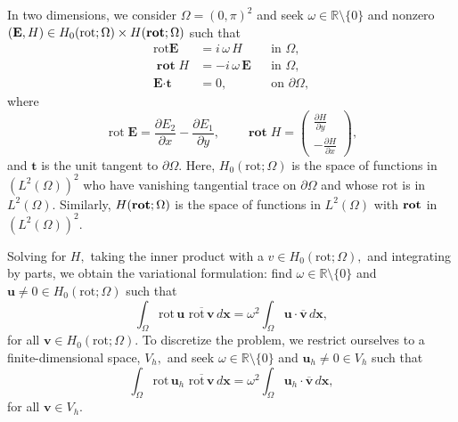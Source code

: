 \documentclass[12pt,a4paper]{article}
\theoremstyle{boldthm}
\theoremstyle{bolddefn}
\begin{document}
In two dimensions, we consider $\Omega = (0, \pi)^2$ and seek $\omega \in \mathbb{R} \setminus \{0\}$ and nonzero $(\mathbf{E}, H) \in H_0(\text{rot}; \Omega) \times H(\text{\textbf{rot}}; \Omega)$ such that 
\begin{equation}
    \begin{aligned}
\operatorname{rot} \textbf{E} &= i \, \omega \, H
&& \text{in } \Omega,\\
\operatorname{\textbf{rot}} H &= -i\, \omega \,  \textbf{E}
&& \text{in } \Omega,\\
\textbf{E}\cdot \textbf{t} &= 0,
&& \text{on } \partial\Omega,
\end{aligned}
\end{equation}
where 
\begin{equation}
    \operatorname{rot} \mathbf{E}
=
\frac{\partial E_2}{\partial x}
-
\frac{\partial E_1}{\partial y},
\qquad
\operatorname{\textbf{rot}} H
=
\begin{pmatrix}
\frac{\partial H}{\partial y}\\
-\frac{\partial H}{\partial x}
\end{pmatrix},
\end{equation}
and $\mathbf{t}$ is the unit tangent to $\partial \Omega.$ Here, $H_0(\text{rot}; \Omega)$ is the space of functions in $(L^2(\Omega))^2$ who have vanishing tangential trace on $\partial \Omega$ and whose $\text{rot}$ is in $L^2(\Omega).$ Similarly, $H(\text{\textbf{rot}}; \Omega)$ is the space of functions in $L^2(\Omega)$ with $\text{\textbf{rot}}$ in $(L^2(\Omega))^2.$ 

Solving for $H,$ taking the inner product with a $v \in H_0(\text{rot}; \Omega),$ and integrating by parts, we obtain the variational formulation: find $\omega \in \mathbb{R}\setminus \{0\}$ and $\mathbf{u} \ne 0 \in H_0(\text{rot}; \Omega)$ such that
\begin{equation}
    \int_{\Omega} \text{rot} \, \textbf{u} \,\, \overline{\text{rot} \, \textbf{v}} \, d\mathbf{x} = \omega^2 \int_{\Omega} \textbf{u} \cdot \overline{\textbf{v}} \, d\textbf{x},
\end{equation}
for all $\mathbf{v} \in H_0(\text{rot}; \Omega).$
To discretize the problem, we restrict ourselves to a finite-dimensional space, $V_h,$ and seek 
$\omega \in \mathbb{R}\setminus \{0\}$ and $\mathbf{u}_h \ne 0 \in V_h$ such that
\begin{equation}
    \int_{\Omega} \text{rot} \, \textbf{u}_h \,\, \overline{\text{rot} \, \textbf{v}} \, d\mathbf{x} = \omega^2 \int_{\Omega} \textbf{u}_h \cdot \overline{\textbf{v}} \, d\textbf{x},
\end{equation}
for all $\mathbf{v} \in V_h.$
\end{document}

